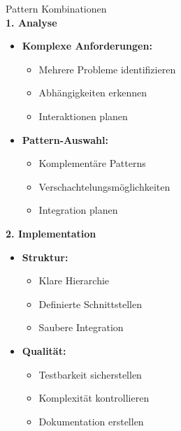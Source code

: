 \begin{KR}{Pattern Kombinationen}\\
\textbf{1. Analyse}
\begin{itemize}
    \item \textbf{Komplexe Anforderungen:}
    \begin{itemize}
        \item Mehrere Probleme identifizieren
        \item Abhängigkeiten erkennen
        \item Interaktionen planen
    \end{itemize}
    
    \item \textbf{Pattern-Auswahl:}
    \begin{itemize}
        \item Komplementäre Patterns
        \item Verschachtelungsmöglichkeiten
        \item Integration planen
    \end{itemize}
\end{itemize}

\textbf{2. Implementation}
\begin{itemize}
    \item \textbf{Struktur:}
    \begin{itemize}
        \item Klare Hierarchie
        \item Definierte Schnittstellen
        \item Saubere Integration
    \end{itemize}
    
    \item \textbf{Qualität:}
    \begin{itemize}
        \item Testbarkeit sicherstellen
        \item Komplexität kontrollieren
        \item Dokumentation erstellen
    \end{itemize}
\end{itemize}
\end{KR}

